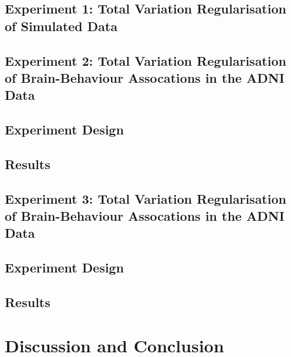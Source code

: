 \subsection{Experiment 1: Total Variation Regularisation of Simulated Data}

\subsection{Experiment 2: Total Variation Regularisation of Brain-Behaviour Assocations in the ADNI Data}
\subsection{Experiment Design}
\subsection{Results}

\subsection{Experiment 3: Total Variation Regularisation of Brain-Behaviour Assocations in the ADNI Data}
\subsection{Experiment Design}
\subsection{Results}


\section{Discussion and Conclusion}



